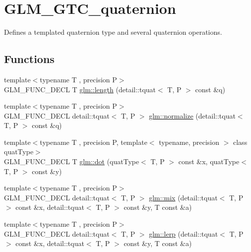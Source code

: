 \hypertarget{group__gtc__quaternion}{\section{G\-L\-M\-\_\-\-G\-T\-C\-\_\-quaternion}
\label{group__gtc__quaternion}
}


Defines a templated quaternion type and several quaternion operations.  


\subsection*{Functions}
\begin{DoxyCompactItemize}
\item 
{\footnotesize template$<$typename T , precision P$>$ }\\G\-L\-M\-\_\-\-F\-U\-N\-C\-\_\-\-D\-E\-C\-L T \hyperlink{group__gtc__quaternion_ga3406ab83e2cafd4034f359957e942410}{glm\-::length} (detail\-::tquat$<$ T, P $>$ const \&q)
\item 
{\footnotesize template$<$typename T , precision P$>$ }\\G\-L\-M\-\_\-\-F\-U\-N\-C\-\_\-\-D\-E\-C\-L detail\-::tquat$<$ T, P $>$ \hyperlink{group__gtc__quaternion_ga34ee289ca53a08207904e935104715d8}{glm\-::normalize} (detail\-::tquat$<$ T, P $>$ const \&q)
\item 
{\footnotesize template$<$typename T , precision P, template$<$ typename, precision $>$ class quat\-Type$>$ }\\G\-L\-M\-\_\-\-F\-U\-N\-C\-\_\-\-D\-E\-C\-L T \hyperlink{group__gtc__quaternion_gac54dfc83de465a2d03e90d342242ab3d}{glm\-::dot} (quat\-Type$<$ T, P $>$ const \&x, quat\-Type$<$ T, P $>$ const \&y)
\item 
{\footnotesize template$<$typename T , precision P$>$ }\\G\-L\-M\-\_\-\-F\-U\-N\-C\-\_\-\-D\-E\-C\-L detail\-::tquat$<$ T, P $>$ \hyperlink{group__gtc__quaternion_gafabf175ae3e2cd30bf58dc313321955a}{glm\-::mix} (detail\-::tquat$<$ T, P $>$ const \&x, detail\-::tquat$<$ T, P $>$ const \&y, T const \&a)
\item 
{\footnotesize template$<$typename T , precision P$>$ }\\G\-L\-M\-\_\-\-F\-U\-N\-C\-\_\-\-D\-E\-C\-L detail\-::tquat$<$ T, P $>$ \hyperlink{group__gtc__quaternion_gafc1c989eaa2c786d34218b176f680fe0}{glm\-::lerp} (detail\-::tquat$<$ T, P $>$ const \&x, detail\-::tquat$<$ T, P $>$ const \&y, T const \&a)

\end{DoxyCompactItemize}
